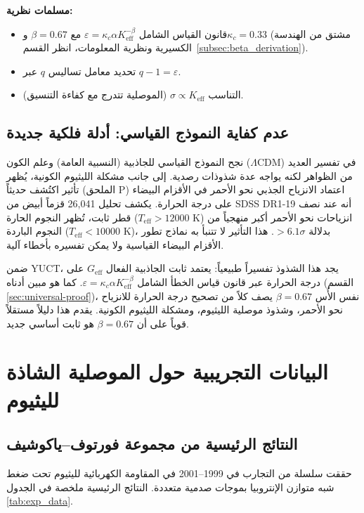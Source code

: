 \documentclass[12pt,a4paper]{article}
\newcommand{\kappac}{\kappa_c}
\newcommand{\Ke}{K_{\mathrm{eff}}}
\newcommand{\alp}{\alpha}
\theoremstyle{remark}
\begin{document}
	\textbf{مسلمات نظرية:}
	\begin{itemize}
		\item قانون القياس الشامل \(\varepsilon = \kappac \alp \Ke^{-\beta}\) مع \(\beta = 0.67\) و\(\kappac = 0.33\) (مشتق من الهندسة الكسيرية ونظرية المعلومات، انظر القسم~\ref{subsec:beta_derivation}).
		\item تحديد معامل تساليس \(q\) عبر \(q-1 = \varepsilon\).
		\item التناسب \(\sigma \propto \Ke\) (الموصلية تتدرج مع كفاءة التنسيق).
	\end{itemize}
	
	\subsection{عدم كفاية النموذج القياسي: أدلة فلكية جديدة}
	\label{subsec:std-inadequacy}
	
	نجح النموذج القياسي للجاذبية (النسبية العامة) وعلم الكون (\(\Lambda\)CDM) في تفسير العديد من الظواهر لكنه يواجه عدة شذوذات رصدية. إلى جانب مشكلة الليثيوم الكونية، يُظهر تأثير اكتُشف حديثاً (الملحق P) اعتماد الانزياح الجذبي نحو الأحمر في الأقزام البيضاء على درجة الحرارة. يكشف تحليل 26,041 قزماً أبيض من SDSS DR1-19 \cite{Crumpler2024} أنه عند نصف قطر ثابت، تُظهر النجوم الحارة (\(T_{\mathrm{eff}} > 12000\) K) انزياحات نحو الأحمر أكبر منهجياً من النجوم الباردة (\(T_{\mathrm{eff}} < 10000\) K)، بدلالة \(>6.1\sigma\). هذا التأثير لا تتنبأ به نماذج تطور الأقزام البيضاء القياسية ولا يمكن تفسيره بأخطاء آلية.
	
	ضمن YUCT، يجد هذا الشذوذ تفسيراً طبيعياً: يعتمد ثابت الجاذبية الفعال \(G_{\mathrm{eff}}\) على درجة الحرارة عبر قانون قياس الخطأ الشامل \(\varepsilon = \kappac \alp \Ke^{-\beta}\). كما هو مبين أدناه (القسم \ref{sec:universal-proof})، نفس الأُس \(\beta = 0.67\) يصف كلاً من تصحيح درجة الحرارة للانزياح نحو الأحمر، وشذوذ موصلية الليثيوم، ومشكلة الليثيوم الكونية. يقدم هذا دليلاً مستقلاً قوياً على أن \(\beta = 0.67\) هو ثابت أساسي جديد.
	
	\section{البيانات التجريبية حول الموصلية الشاذة لليثيوم}
	
	\subsection{النتائج الرئيسية من مجموعة فورتوف–ياكوشيف}
	
	حققت سلسلة من التجارب في 1999–2001 \cite{fortov1999, fortov2001, yakushev2002} في المقاومة الكهربائية لليثيوم تحت ضغط شبه متوازن الإنتروبيا بموجات صدمية متعددة. النتائج الرئيسية ملخصة في الجدول \ref{tab:exp_data}.
	
\end{document}
